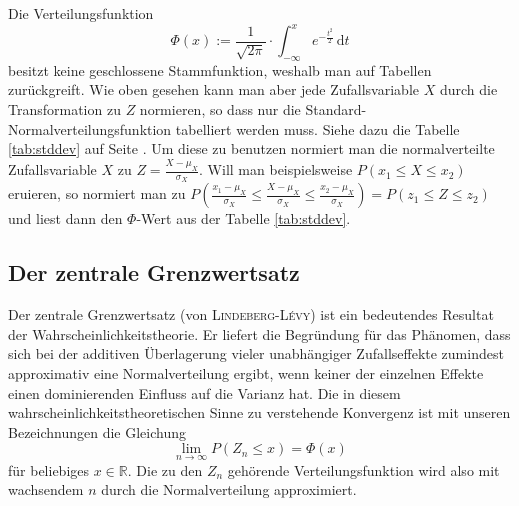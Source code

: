 \documentclass[%
11pt,%
twoside,%
titlepage,%
german,%
headsepline%
]{scrartcl}
\newcounter{theo}[section]\setcounter{theo}{0}
\begin{document}
Die Verteilungsfunktion
$$\Phi(x):=\frac{1}{\sqrt{2\pi}}\cdot\int_{-\infty}^{x} e^{-\frac{t^2}{2}}\,\mathrm{d}t$$
besitzt keine geschlossene Stammfunktion, weshalb man auf Tabellen zurückgreift. Wie oben gesehen kann man aber jede Zufallsvariable $X$ durch die Transformation zu $Z$ normieren, so dass nur die Standard-Normalverteilungsfunktion tabelliert werden muss. Siehe dazu die Tabelle \ref{tab:stddev} auf Seite \pageref{tab:stddev}. Um diese zu benutzen normiert man die normalverteilte Zufallsvariable $X$ zu $Z=\frac{X-\mu_{X}}{\sigma_{X}}$. Will man beispielsweise $P(x_{1}\leq X\leq x_{2})$ eruieren, so normiert man zu $P\left(\frac{x_{1}-\mu_{X}}{\sigma_{X}}\leq\frac{X-\mu_{X}}{\sigma_{X}}\leq \frac{x_{2}-\mu_{X}}{\sigma_{X}}\right)=P(z_{1}\leq Z\leq z_{2})$ und liest dann den $\Phi$-Wert aus der Tabelle \ref{tab:stddev}.

\subsection{Der zentrale Grenzwertsatz}

Der zentrale Grenzwertsatz (von \textsc{Lindeberg-Lévy}) ist ein bedeutendes Resultat der Wahrscheinlichkeitstheorie. Er liefert die Begründung für das Phänomen, dass sich bei der additiven Überlagerung vieler unabhängiger Zufallseffekte zumindest approximativ eine Normalverteilung ergibt, wenn keiner der einzelnen Effekte einen dominierenden Einfluss auf die Varianz hat. Die in diesem wahrscheinlichkeitstheoretischen Sinne zu verstehende Konvergenz ist mit unseren Bezeichnungen die Gleichung
$$\lim_{n\to\infty} P(Z_n\leq x)=\Phi(x)$$
für beliebiges $x\in\mathbb{R}$.
Die zu den $Z_n$ gehörende Verteilungsfunktion wird also mit wachsendem $n$ durch die Normalverteilung approximiert.

\clearpage
\end{document}
